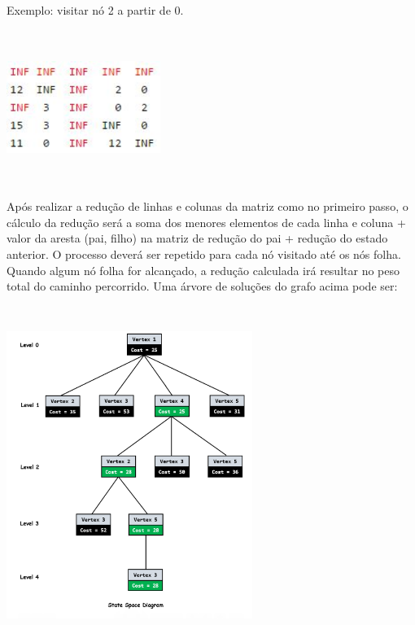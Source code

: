 \documentclass{article}
\begin{document}
Exemplo: visitar nó 2 a partir de 0. 

\begin{center}
\par \includegraphics[width=5cm, height=5cm]{matriz3.jpg} \par
\end{center}

Após realizar a redução de linhas e colunas da matriz como no primeiro passo, o cálculo da redução será a soma dos menores elementos de cada linha e coluna + valor da aresta (pai, filho) na matriz de redução do pai + redução do estado anterior. O processo deverá ser repetido para cada nó visitado até os nós folha. Quando algum nó folha for alcançado, a redução calculada irá resultar no peso total do caminho percorrido. Uma árvore de soluções do grafo acima pode ser: 

\begin{center}
\par \includegraphics[width=8cm, height=11cm]{arvore.png} \par
\end{center}
\end{document}
